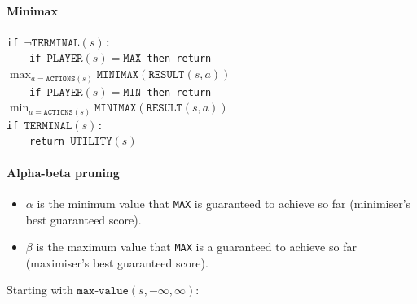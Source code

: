 \documentclass[twocolumn,english]{article}
\begin{document}
\paragraph{Minimax}

 
\begin{table}[H]
\raggedright{}\texttt{\small{}{}if $\lnot\texttt{TERMINAL}\left(s\right)$:}{\small{}~}\\
{\small{} }\texttt{\small{}{}$\qquad$if $\texttt{PLAYER}\left(s\right)=\texttt{MAX}$
then return $\max_{a=\texttt{ACTIONS}\left(s\right)}\texttt{MINIMAX}\left(\texttt{RESULT}\left(s,a\right)\right)$}{\small{}~}\\
{\small{} }\texttt{\small{}{}$\qquad$if $\texttt{PLAYER}\left(s\right)=\texttt{MIN}$
then return $\min_{a=\texttt{ACTIONS}\left(s\right)}\texttt{MINIMAX}\left(\texttt{RESULT}\left(s,a\right)\right)$}{\small{}~}\\
{\small{} }\texttt{\small{}{}if $\texttt{TERMINAL}\left(s\right)$:}{\small{}~}\\
{\small{} }\texttt{\small{}{}$\qquad$return $\texttt{UTILITY}\left(s\right)$}{\small{} }
\end{table}

\paragraph{Alpha-beta pruning}
\begin{itemize}
\item $\alpha$ is the minimum value that \texttt{MAX} is guaranteed to
achieve so far (minimiser's best guaranteed score). 
\item $\beta$ is the maximum value that \texttt{MAX} is a guaranteed to
achieve so far (maximiser's best guaranteed score). 
\end{itemize}
Starting with $\texttt{max-value}\left(s,-\infty,\infty\right)$:
\end{document}
